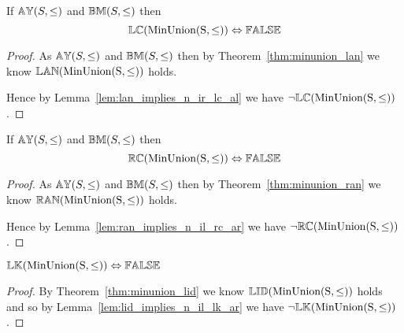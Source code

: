 \begin{theorem} \label{thm:minunion_lc}
If ${\mathbb{AY}}(S, \leq)$ and ${\mathbb{BM}}(S, \leq)$ then
\begin{equation*}
{\mathbb{LC}}(\mathrm{MinUnion(S,\leq)}) \Leftrightarrow {\mathbb{FALSE}}
\end{equation*}
\end{theorem}

\begin{proof}

\vspace{0.5em}
As ${\mathbb{AY}}(S, \leq)$ and ${\mathbb{BM}}(S, \leq)$ then by Theorem~\ref{thm:minunion_lan} we know ${\mathbb{LAN}}(\mathrm{MinUnion(S,\leq)})$ holds.

\vspace{0.5em}
Hence by Lemma~\ref{lem:lan_implies_n_ir_lc_al} we have $\neg {\mathbb{LC}}(\mathrm{MinUnion(S,\leq)})$.
\end{proof}





\begin{theorem} \label{thm:minunion_rc}
If ${\mathbb{AY}}(S, \leq)$ and ${\mathbb{BM}}(S, \leq)$ then
\begin{equation*}
{\mathbb{RC}}(\mathrm{MinUnion(S,\leq)}) \Leftrightarrow {\mathbb{FALSE}}
\end{equation*}
\end{theorem}

\begin{proof}

\vspace{0.5em}
As ${\mathbb{AY}}(S, \leq)$ and ${\mathbb{BM}}(S, \leq)$ then by Theorem~\ref{thm:minunion_ran} we know ${\mathbb{RAN}}(\mathrm{MinUnion(S,\leq)})$ holds.

\vspace{0.5em}
Hence by Lemma~\ref{lem:ran_implies_n_il_rc_ar} we have $\neg {\mathbb{RC}}(\mathrm{MinUnion(S,\leq)})$.
\end{proof}





\begin{theorem} \label{thm:minunion_lk}
${\mathbb{LK}}(\mathrm{MinUnion(S,\leq)}) \Leftrightarrow {\mathbb{FALSE}}$
\end{theorem}

\begin{proof}

\vspace{0.5em}

By Theorem~\ref{thm:minunion_lid} we know ${\mathbb{LID}}(\mathrm{MinUnion(S,\leq)})$ holds and so by Lemma~\ref{lem:lid_implies_n_il_lk_ar} we have $\neg {\mathbb{LK}}(\mathrm{MinUnion(S,\leq)})$.
\end{proof}






